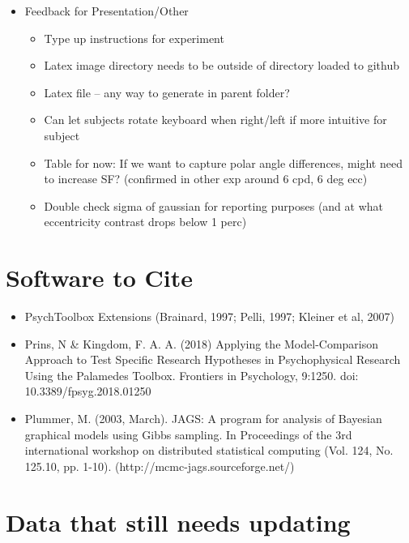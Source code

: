 \documentclass[11pt]{article} %
\begin{document}
\begin{itemize}
\begin{itemize}
	\end{itemize}
\item Feedback for Presentation/Other
	\begin{itemize}
	\item Type up instructions for experiment
	\item Latex image directory needs to be outside of directory loaded to github
	\item Latex file -- any way to generate in parent folder?
	\item Can let subjects rotate keyboard when right/left if more intuitive for subject
	\item Table for now: If we want to capture polar angle differences, might need to increase SF? (confirmed in other exp around 6 cpd, 6 deg ecc)
	\item Double check sigma of gaussian for reporting purposes (and at what eccentricity contrast drops below 1 perc)
	\end{itemize}
\end{itemize}

\section{Software to Cite}
\begin{itemize}
\item PsychToolbox Extensions (Brainard, 1997; Pelli, 1997; Kleiner et al, 2007)
\item Prins, N \& Kingdom, F. A. A. (2018) Applying the Model-Comparison Approach to Test Specific Research Hypotheses in Psychophysical Research Using the Palamedes Toolbox. Frontiers in Psychology, 9:1250. doi: 10.3389/fpsyg.2018.01250
\item Plummer, M. (2003, March). JAGS: A program for analysis of Bayesian graphical models using Gibbs sampling. In Proceedings of the 3rd international workshop on distributed statistical computing (Vol. 124, No. 125.10, pp. 1-10). (http://mcmc-jags.sourceforge.net/)
\end{itemize}

\newpage
\newpage
\section{Data that still needs updating}
\end{document}
